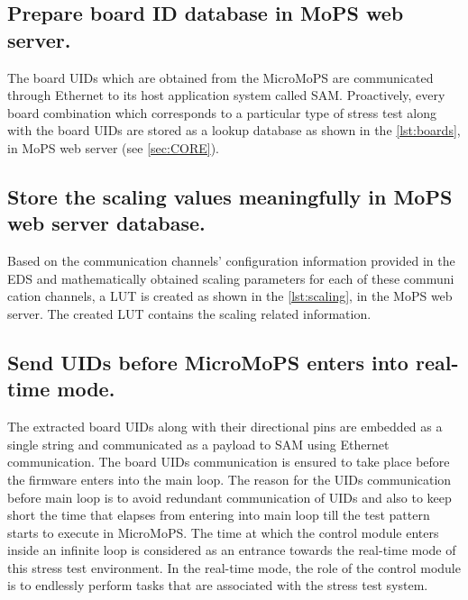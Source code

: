\subsection{Prepare board ID database in MoPS web server.}\label{sec:web server}
The board \glspl{UID} which are obtained from the MicroMoPS are communicated through Ethernet to its host application system called SAM.
Proactively, every board combination which corresponds to a particular type of stress test along with the board \glspl{UID} are stored as a lookup database as shown in the \cref{lst:boards}, in MoPS web server (see \cref{sec:CORE}). 




\subsection{Store the scaling values meaningfully in MoPS web server database.}\label{sec:database}
Based on the communication channels' configuration information provided in the EDS and mathematically obtained scaling parameters for each of these communi	cation channels, a \gls{LUT} is created as shown in the \cref{lst:scaling}, in the \gls{MoPS} web server.
The created \gls{LUT} contains the scaling related information.  




\subsection{Send UIDs before MicroMoPS enters into real-time mode.}\label{sec:UID}
The extracted board \glspl{UID} along with their directional pins are embedded as a single string and communicated as a payload to \acrshort{SAM} using Ethernet communication. 
The board UIDs communication is ensured to take place before the firmware enters into the main loop. 
The reason for the UIDs communication before main loop is to avoid redundant communication of UIDs and also to keep short the time that elapses from entering into main loop till the test pattern starts to execute in MicroMoPS. The time at which the control module enters inside an infinite loop is considered as an entrance towards the real-time mode of this stress test environment. In the real-time mode, the role of the control module is to endlessly perform tasks that are associated with the stress test system.
 
